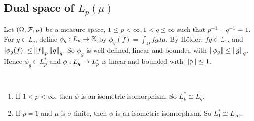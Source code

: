 \documentclass{article}
\begin{document}
\subsection{Dual space of \texorpdfstring{$L_p(\mu)$}{Lp(mu)}}

Let $(\Omega, \mathcal F, \mu)$ be a measure space, $1 \le p < \infty, 1 < q \le \infty$ such that $p^{-1} + q^{-1} = 1$. For $g \in L_q$, define $\phi_g : L_p \rightarrow \mathbb K$ by $\phi_g(f) = \int_\Omega fg d\mu$. By Hölder, $fg \in L_1$, and $\left\lvert \phi_g(f)\right\rvert \le \left\lVert f\right\rVert_p \left\lVert g\right\rVert_q$. So $\phi_g$ is well-defined, linear and bounded with $\left\lVert \phi_g\right\rVert \le \left\lVert g\right\rVert_q$. Hence $\phi_g \in L_p^*$ and $\phi : L_q \rightarrow L_p^*$ is linear and bounded with $\left\lVert \phi\right\rVert \le 1$.

\begin{nthm}\label{thm:lp-dual}~
  \begin{enumerate}
    \item If $1 < p < \infty$, then $\phi$ is an isometric isomorphism. So $L_p^* \cong L_q$.
    \item If $p = 1$ and $\mu$ is $\sigma$-finite, then $\phi$ is an isometric isomorphism. So $L_1^* \cong L_\infty$.
  \end{enumerate}
\end{nthm}
\end{document}
